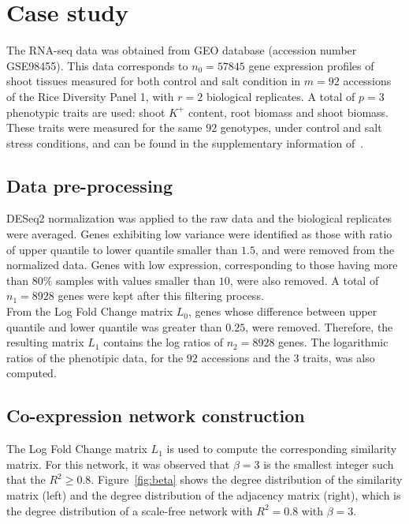 \documentclass[12pt,journal, onecolumn]{IEEEtran}
\begin{document}

\section{Case study}
The RNA-seq data was obtained from GEO database \cite{GEOAcces90:online} (accession number GSE98455). This data corresponds to $n_0=57845$ gene expression profiles of shoot tissues measured for both control and salt condition in $m=92$ accessions of the Rice Diversity Panel 1, with $r=2$ biological replicates. A total of $p=3 $ phenotypic traits are used: shoot $K^+$ content, root biomass and shoot biomass. These traits were measured for the same $92$ genotypes, under  control and salt stress conditions, and can be found in the supplementary information of~\cite{campbell2017allelic}.\\

\subsection{Data pre-processing}
DESeq2 normalization was applied to the raw data and the biological replicates were averaged. Genes exhibiting low variance were identified as those with ratio of upper quantile to lower quantile smaller than $1.5$, and were removed from the normalized data. Genes with low expression, corresponding to those having more than $80\%$ samples with values smaller than $10$, were also removed. A total of $n_1 = 8928$ genes were kept after this filtering process.\\

From the Log Fold Change matrix $L_0$, genes whose difference between upper quantile and lower quantile was greater than $0.25$, were removed. Therefore, the resulting matrix $L_1$ contains the log ratios of $n_2 = 8928$ genes. The logarithmic ratios of the phenotipic data, for the $92$ accessions and the $3$ traits, was also computed.\\   

\subsection{Co-expression network construction}
The Log Fold Change matrix $L_1$ is used to compute the corresponding similarity matrix. 
For this network, it was observed that $\beta=3$ is the smallest integer such that the $R^2 \geq 0.8 $. Figure~\ref{fig:beta} shows the degree distribution of the similarity matrix (left) and the degree distribution of the adjacency matrix (right), which is the degree distribution of a scale-free network with $R^2 = 0.8$ with $\beta = 3$.
\end{document}
